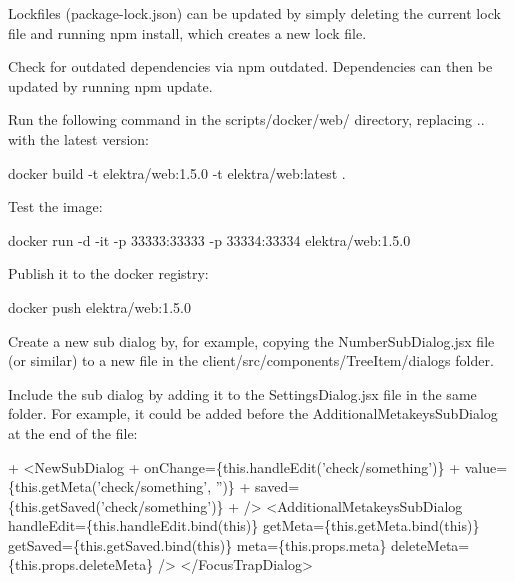 Lockfiles ({\ttfamily package-\/lock.\+json}) can be updated by simply deleting the current lock file and running {\ttfamily npm install}, which creates a new lock file.

Check for outdated dependencies via {\ttfamily npm outdated}. Dependencies can then be updated by running {\ttfamily npm update}.

Run the following command in the {\ttfamily scripts/docker/web/} directory, replacing {..} with the latest version\+:


\begin{DoxyCode}
docker build -t elektra/web:1.5.0 -t elektra/web:latest .
\end{DoxyCode}


Test the image\+:


\begin{DoxyCode}
docker run -d -it -p 33333:33333 -p 33334:33334 elektra/web:1.5.0
\end{DoxyCode}


Publish it to the docker registry\+:


\begin{DoxyCode}
docker push elektra/web:1.5.0
\end{DoxyCode}



\begin{DoxyItemize}
\item Create a new sub dialog by, for example, copying the {\ttfamily Number\+Sub\+Dialog.\+jsx} file (or similar) to a new file in the {\ttfamily client/src/components/\+Tree\+Item/dialogs} folder.
\item Include the sub dialog by adding it to the {\ttfamily Settings\+Dialog.\+jsx} file in the same folder. For example, it could be added before the Additional\+Metakeys\+Sub\+Dialog at the end of the file\+:
\end{DoxyItemize}


\begin{DoxyCode}
+     <NewSubDialog
+       onChange=\{this.handleEdit('check/something')\}
+       value=\{this.getMeta('check/something', '')\}
+       saved=\{this.getSaved('check/something')\}
+     />
      <AdditionalMetakeysSubDialog
        handleEdit=\{this.handleEdit.bind(this)\}
        getMeta=\{this.getMeta.bind(this)\}
        getSaved=\{this.getSaved.bind(this)\}
        meta=\{this.props.meta\}
        deleteMeta=\{this.props.deleteMeta\}
      />
    </FocusTrapDialog>
\end{DoxyCode}




